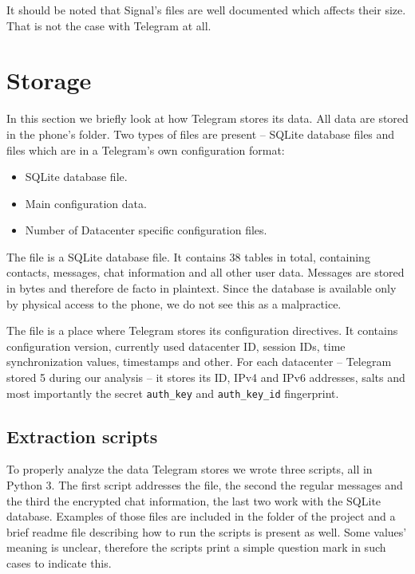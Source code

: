 \documentclass[thesis=M,english]{FITthesis}[2012/10/20]
\begin{document}
It should be noted that Signal's files are well documented which affects their size. That is not the case with Telegram at all.

\section{Storage}\label{analysis-storage}

In this section we briefly look at how Telegram stores its data. All data are stored in the phone's  folder. Two types of files are present -- SQLite database files and  files which are in a Telegram's own configuration format:

\begin{itemize}
	\item {} SQLite database file.
	\item {} Main configuration data.
	\item {} Number of Datacenter specific configuration files.
\end{itemize}

The  file is a SQLite database file. It contains 38 tables in total, containing contacts, messages, chat information and all other user data. Messages are stored in bytes and therefore de facto in plaintext. Since the database is available only by physical access to the phone, we do not see this as a malpractice.

The  file is a place where Telegram stores its configuration directives. It contains configuration version, currently used datacenter ID, session IDs, time synchronization values, timestamps and other. For each datacenter -- Telegram stored 5 during our analysis -- it stores its ID, IPv4 and IPv6 addresses, salts and most importantly the secret \texttt{auth\_key} and \texttt{auth\_key\_id} fingerprint.

\subsection{Extraction scripts}\label{analysis-storage-scripts}

To properly analyze the data Telegram stores we wrote three scripts, all in Python 3. The first script addresses the  file, the second the regular messages and the third the encrypted chat information, the last two work with the SQLite database. Examples of those files are included in the  folder of the project and a brief readme file describing how to run the scripts is present as well. Some values' meaning is unclear, therefore the scripts print a simple question mark in such cases to indicate this.
\end{document}
